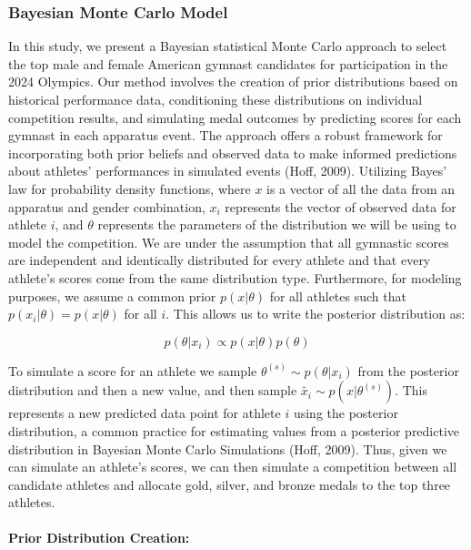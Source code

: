 \documentclass[
  letterpaper,
  DIV=11,
  numbers=noendperiod]{scrartcl}
\let\oldparagraph\paragraph
\renewcommand{\paragraph}[1]{\oldparagraph{#1}\mbox{}}
\begin{document}
\hypertarget{bayesian-monte-carlo-model}{%
\subsubsection{Bayesian Monte Carlo
Model}\label{bayesian-monte-carlo-model}}

In this study, we present a Bayesian statistical Monte Carlo approach to
select the top male and female American gymnast candidates for
participation in the 2024 Olympics. Our method involves the creation of
prior distributions based on historical performance data, conditioning
these distributions on individual competition results, and simulating
medal outcomes by predicting scores for each gymnast in each apparatus
event. The approach offers a robust framework for incorporating both
prior beliefs and observed data to make informed predictions about
athletes' performances in simulated events (Hoff, 2009). Utilizing
Bayes' law for probability density functions, where \(x\) is a vector of
all the data from an apparatus and gender combination, \(x_i\)
represents the vector of observed data for athlete \(i\), and \(\theta\)
represents the parameters of the distribution we will be using to model
the competition. We are under the assumption that all gymnastic scores
are independent and identically distributed for every athlete and that
every athlete's scores come from the same distribution type.
Furthermore, for modeling purposes, we assume a common prior
\(p(x| \theta)\) for all athletes such that
\(p(x_i | \theta) = p(x| \theta)\) for all \(i\). This allows us to
write the posterior distribution as:

\[
p(\theta |x_i) \propto p(x| \theta) p(\theta)
\]

To simulate a score for an athlete we sample
\(\theta^{(s)} \sim p(\theta | x_i)\) from the posterior distribution
and then a new value, and then sample
\(\tilde{x_i} \sim p(x| \theta^{(s)})\). This represents a new predicted
data point for athlete \(i\) using the posterior distribution, a common
practice for estimating values from a posterior predictive distribution
in Bayesian Monte Carlo Simulations (Hoff, 2009). Thus, given we can
simulate an athlete's scores, we can then simulate a competition between
all candidate athletes and allocate gold, silver, and bronze medals to
the top three athletes.

\hypertarget{prior-distribution-creation}{%
\paragraph{Prior Distribution
Creation:}\label{prior-distribution-creation}}
\end{document}
